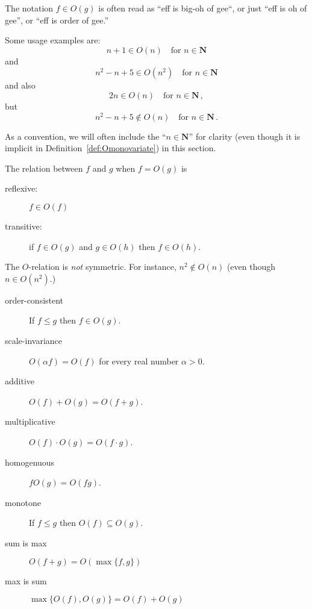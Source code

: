 \documentclass{tstextbook}
\begin{document}
The notation \(f \in O(g)\) is often read as “eff is big-oh of gee“, or just “eff is oh of gee”, or “eff is order of  gee.'' 

\begin{example}
Some usage examples are:
  \[ n + 1 \in O(n) \quad\text{for $n\in\mathbf N$}\]
  and
  \[ n^2 -n + 5 \in O(n^2) \quad\text{for $n\in\mathbf N$}\]
and also
\[ 2n \in O ( n) \quad\text{for $n\in\mathbf N$}\,,\]
but  
\[ n^2 - n + 5 \notin O(n) \quad\text{for $n\in\mathbf N$}\,. \] 
\end{example}

As a convention, we will often  include the ``$n\in\mathbf N$'' for clarity (even though it is implicit in Definition~\ref{def:Omonovariate}) in this section.


\begin{theorem}[As a relation]
  \label{thm: Oh as a relation}
The relation between \(f\) and \(g\) when \(f=O(g)\) is
  \begin{description}
    \item[reflexive:] \( f \in O(f)\)
    \item[transitive:] if \( f\in O( g)\) and \(g\in O(h)\) then \(f\in O( h)\).
  \end{description}
\end{theorem}

The $O$-relation is \emph{not} symmetric.
For instance, $n^2\notin O(n)$ (even though $n\in O(n^2)$.)

\begin{theorem}[Properties] 
  \label{thm: Oh rules}
  \begin{description}
    \item[order-consistent] If \(f\leq g\) then \(f \in O(g)\).
    \item[scale-invariance] \(O(\alpha f) = O(f)\) for every real number $\alpha > 0$.
    \item[additive] \( O(f)+ O( g) = O(f + g)\).
    \item[multiplicative] \( O(f)\cdot O( g) = O(f \cdot g)\).
    \item[homogenuous] $fO(g) = O(fg)$.
    \item[monotone] If $f\leq g$ then $O(f) \subseteq O(g)$.
    \item[sum is max] $O(f + g) = O(\max \{f, g\})$
    \item[max is sum] $\max\{O(f) , O(g)\} = O(f) + O(g)$
  \end{description}
\end{theorem}
\end{document}
